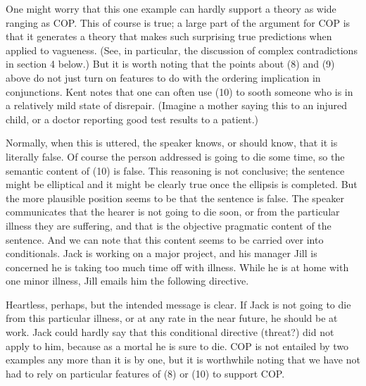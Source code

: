 One might worry that this one example can hardly support a theory as wide ranging as COP. This of course is true; a large part of the argument for COP is that it generates a theory that makes such surprising true predictions when applied to vagueness. (See, in particular, the discussion of complex contradictions in section 4 below.) But it is worth noting that the points about (8) and (9) above do not just turn on features to do with the ordering implication in conjunctions. Kent \cite[134]{Bach1994} notes that one can often use (10) to sooth someone who is in a relatively mild state of disrepair. (Imagine a mother saying this to an injured child, or a doctor reporting good test results to a patient.)


\noindent Normally, when this is uttered, the speaker knows, or should know, that it is literally false. Of course the person addressed is going to die some time, so the semantic content of (10) is false. This reasoning is not conclusive; the sentence might be elliptical and it might be clearly true once the ellipsis is completed. But the more plausible position seems to be that the sentence is false. The speaker communicates that the hearer is not going to die soon, or from the particular illness they are suffering, and that is the objective pragmatic content of the sentence. And we can note that this content seems to be carried over into conditionals. Jack is working on a major project, and his manager Jill is concerned he is taking too much time off with illness. While he is at home with one minor illness, Jill emails him the following directive.


\noindent Heartless, perhaps, but the intended message is clear. If Jack is not going to die from this particular illness, or at any rate in the near future, he should be at work. Jack could hardly say that this conditional directive (threat?) did not apply to him, because as a mortal he is sure to die. COP is not entailed by two examples any more than it is by one, but it is worthwhile noting that we have not had to rely on particular features of (8) or (10) to support COP.

